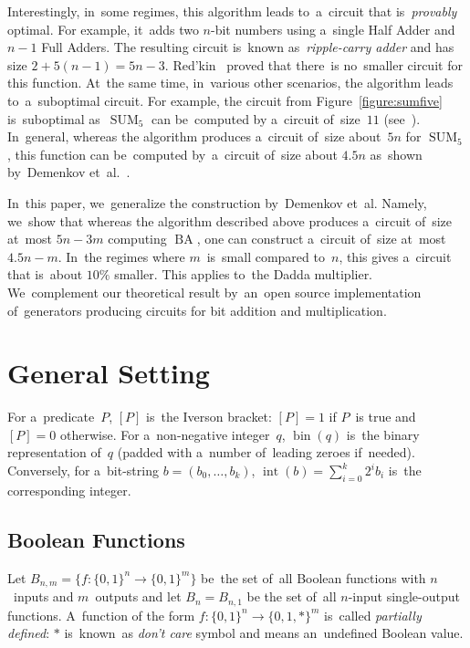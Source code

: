 \documentclass[sigconf, review, anonymous]{acmart}
\DeclareMathOperator{\SUM}{SUM}
\DeclareMathOperator{\BA}{BA}
\begin{document}
Interestingly, in~some regimes, this algorithm leads to~a~circuit
that is~\emph{provably} optimal. For example, it~adds two $n$-bit
numbers using a~single Half Adder and $n-1$ Full Adders. The resulting
circuit is~known as~\emph{ripple-carry adder} and has size $2+5(n-1)=5n-3$. Red'kin~\cite{Red81} proved
that there~is no~smaller circuit for this function.
At~the same time, in~various other scenarios, the algorithm leads
to~a~suboptimal circuit. For example, the circuit from Figure~\ref{figure:sumfive} is~suboptimal as~$\SUM_5$
can be~computed by a~circuit of~size~$11$ (see~\cite{DBLP:conf/mfcs/KulikovPS22}).
In~general, whereas the algorithm produces a~circuit of~size about~$5n$
for $\SUM_5$, this function can be~computed by~a~circuit of~size about $4.5n$
as~shown by~Demenkov et~al.~\cite{DBLP:journals/ipl/DemenkovKKY10}.

In~this paper, we~generalize the construction by~Demenkov et~al.
Namely, we~show that whereas the algorithm described above produces
a~circuit of~size at~most $5n-3m$ computing $\BA$, one can construct
a~circuit of~size at~most $4.5n-m$. In~the regimes where $m$~is~small
compared to~$n$, this gives a~circuit that is~about $10\%$ smaller.
This applies to~the Dadda multiplier.
We~complement our theoretical result by~an~open source implementation
of~generators producing circuits for bit addition and multiplication.

\section{General Setting}
For a~predicate~$P$, $[P]$ is~the Iverson bracket: $[P]=1$ if $P$~is true and $[P]=0$ otherwise. For a~non-negative integer~$q$,
$\operatorname{bin}(q)$ is~the binary representation of~$q$
(padded with a~number of~leading zeroes if~needed).
Conversely, for a~bit-string $b=(b_0,\dotsc, b_k)$, $\operatorname{int}(b)=\sum_{i=0}^{k}2^ib_i$ is~the corresponding integer.

\subsection{Boolean Functions}
Let $B_{n,m}=\{f \colon \{0,1\}^n \to \{0,1\}^m\}$ be~the set of~all Boolean functions with $n$~inputs and $m$~outputs
and let $B_n=B_{n,1}$ be the set of~all $n$-input single-output functions.
A~function of the form $f \colon \{0,1\}^n \to \{0,1,*\}^m$
is~called \emph{partially defined}: $*$ is~known~as \emph{don't care} symbol
and means an~undefined Boolean value.
\end{document}
